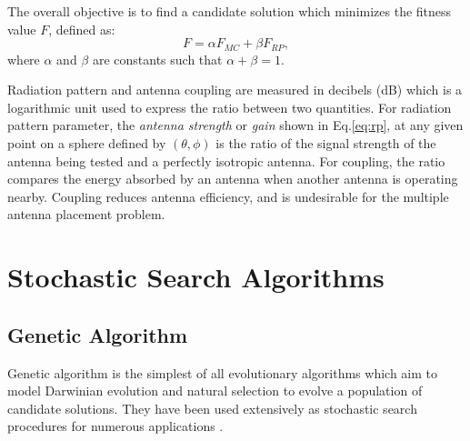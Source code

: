 \documentclass[conference]{IEEEtran}
\begin{document}
The overall objective is to find a candidate solution which minimizes the fitness value $F$, defined as:
\begin{equation} \label{eq:optimal}
  F = \alpha F_{MC} + \beta F_{RP},
\end{equation}
where $\alpha$ and $\beta$ are constants such that $\alpha + \beta = 1$. 

Radiation pattern and antenna coupling are measured in decibels (dB) which is a logarithmic unit used to express the ratio between two quantities. For radiation pattern parameter, the \textit{antenna strength} or \textit{gain} shown in Eq.\eqref{eq:rp}, at any given point on a sphere defined by $(\theta, \phi)$ is the ratio of the signal strength of the antenna being tested and a perfectly isotropic antenna. For coupling, the ratio compares the energy absorbed by an antenna when another antenna is operating nearby. Coupling reduces antenna efficiency, and is undesirable for the multiple antenna placement problem.

\section{Stochastic Search Algorithms}
\label{sec:algorithms}
\subsection{Genetic Algorithm}
\label{sec:algorithms-ga}
Genetic algorithm is the simplest of all evolutionary algorithms which aim to model Darwinian evolution and natural selection to evolve a population of candidate solutions. They have been used extensively as stochastic search procedures for numerous applications \cite{fogel1994}.
\end{document}
